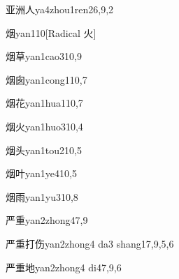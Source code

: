 \begin{verbete}{亚洲人}{ya4zhou1ren2}{6,9,2}
\end{verbete}

\begin{verbete}{烟}{yan1}{10}[Radical 火]
\end{verbete}

\begin{verbete}{烟草}{yan1cao3}{10,9}
\end{verbete}

\begin{verbete}{烟囱}{yan1cong1}{10,7}
\end{verbete}

\begin{verbete}{烟花}{yan1hua1}{10,7}
\end{verbete}

\begin{verbete}{烟火}{yan1huo3}{10,4}
\end{verbete}

\begin{verbete}{烟头}{yan1tou2}{10,5}
\end{verbete}

\begin{verbete}{烟叶}{yan1ye4}{10,5}
\end{verbete}

\begin{verbete}{烟雨}{yan1yu3}{10,8}
\end{verbete}

\begin{verbete}{严重}{yan2zhong4}{7,9}
\end{verbete}

\begin{verbete}{严重打伤}{yan2zhong4 da3 shang1}{7,9,5,6}
\end{verbete}

\begin{verbete}{严重地}{yan2zhong4 di4}{7,9,6}
\end{verbete}

